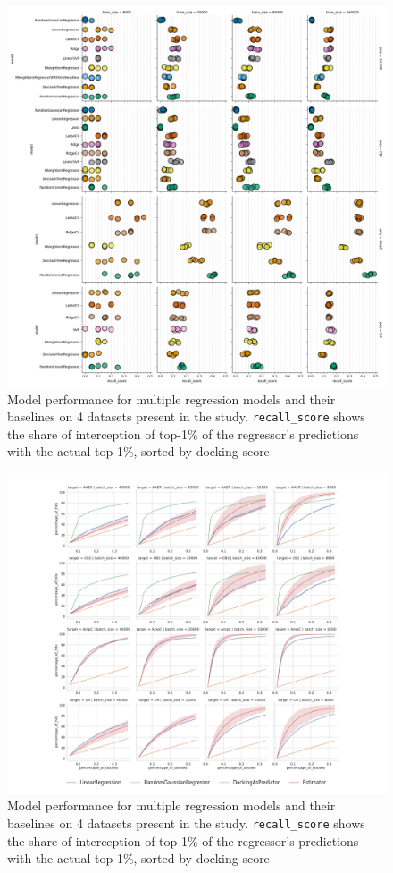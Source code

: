 \begin{figure}[ht]
\centering
\includegraphics[width=1.0\textwidth]{figures/figure_3_single-shot-performance.png}
\caption{Model performance for multiple regression models and their baselines on 4 datasets present in the study. \texttt{recall\_score} shows the share of interception of top-1\% of the regressor's predictions with the actual top-1\%, sorted by docking score}
\label{fig:fig_3_singleshot}
\end{figure}


\begin{figure}[ht]
\centering
\includegraphics[width=1.0\textwidth]{figures/figure_4_iterations.pdf}
\caption{Model performance for multiple regression models and their baselines on 4 datasets present in the study. \texttt{recall\_score} shows the share of interception of top-1\% of the regressor's predictions with the actual top-1\%, sorted by docking score}
\label{fig:fig_4_extrapolation}
\end{figure}


